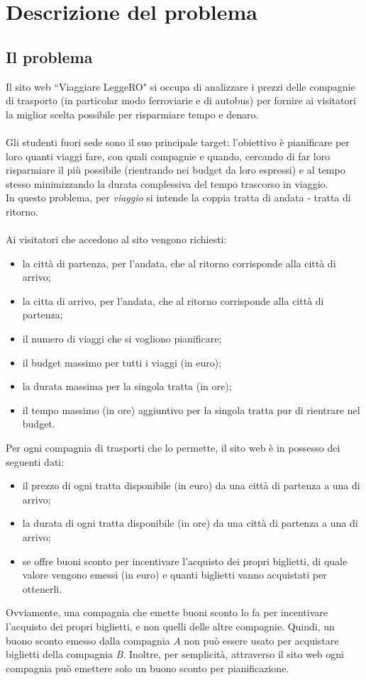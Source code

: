 \documentclass[main.tex]{subfiles}
\begin{document}
\section{Descrizione del problema}
\subsection{Il problema}
Il sito web ``Viaggiare LeggeRO" si occupa di analizzare i prezzi delle compagnie di trasporto (in particolar modo ferroviarie e di autobus) per fornire
ai visitatori la miglior scelta possibile per risparmiare tempo e denaro.\\ \\
Gli studenti fuori sede sono il suo principale target: l'obiettivo è pianificare per loro quanti viaggi fare, con quali compagnie e quando, cercando di far loro
risparmiare il più possibile (rientrando nei budget da loro espressi) e al tempo stesso minimizzando la durata complessiva del tempo trascorso in viaggio.\\
In questo problema, per \textit{viaggio} si intende la coppia tratta di andata - tratta di ritorno.\\ \\
Ai visitatori che accedono al sito vengono richiesti:
\begin{itemize}
    \item la città di partenza, per l'andata, che al ritorno corrisponde alla città di arrivo;
    \item la citta di arrivo, per l'andata, che al ritorno corrisponde alla città di partenza;
    \item il numero di viaggi che si vogliono pianificare;
    \item il budget massimo per tutti i viaggi (in euro);
    \item la durata massima per la singola tratta (in ore);
    \item il tempo massimo (in ore) aggiuntivo per la singola tratta pur di rientrare nel budget.
\end{itemize}
Per ogni compagnia di trasporti che lo permette, il sito web è in possesso dei seguenti dati:
\begin{itemize}
    \item il prezzo di ogni tratta disponibile (in euro) da una città di partenza a una di arrivo;
    \item la durata di ogni tratta disponibile (in ore)  da una città di partenza a una di arrivo;
    \item se offre buoni sconto per incentivare l'acquisto dei propri biglietti, di quale valore vengono emessi (in euro) e quanti biglietti vanno acquistati per ottenerli.
\end{itemize}
Ovviamente, una compagnia che emette buoni sconto lo fa per incentivare l'acquisto dei propri biglietti, e non quelli delle altre compagnie. Quindi, un buono sconto emesso dalla compagnia \textit{A} non può essere usato per acquistare biglietti della compagnia \textit{B}.
Inoltre, per semplicità, attraverso il sito web ogni compagnia può emettere solo un buono sconto per pianificazione.
\end{document}
